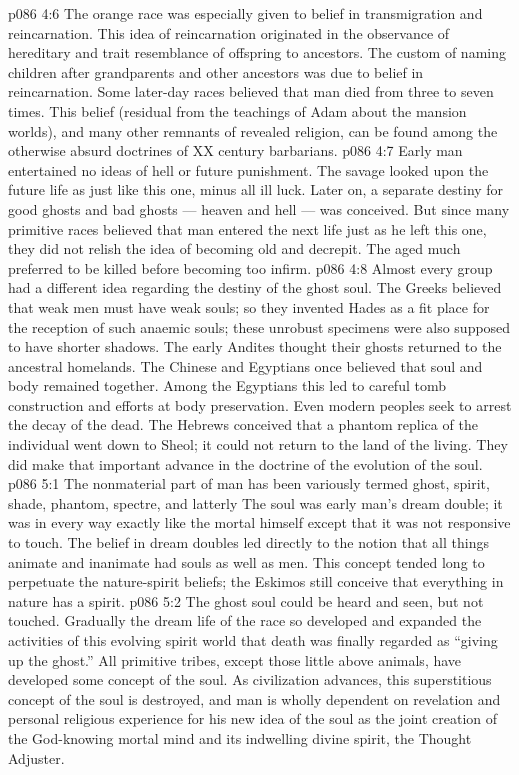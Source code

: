 \vs p086 4:6 The orange race was especially given to belief in transmigration and reincarnation. This idea of reincarnation originated in the observance of hereditary and trait resemblance of offspring to ancestors. The custom of naming children after grandparents and other ancestors was due to belief in reincarnation. Some later\hyp{}day races believed that man died from three to seven times. This belief (residual from the teachings of Adam about the mansion worlds), and many other remnants of revealed religion, can be found among the otherwise absurd doctrines of XX century barbarians.
\vs p086 4:7 \pc Early man entertained no ideas of hell or future punishment. The savage looked upon the future life as just like this one, minus all ill luck. Later on, a separate destiny for good ghosts and bad ghosts --- heaven and hell --- was conceived. But since many primitive races believed that man entered the next life just as he left this one, they did not relish the idea of becoming old and decrepit. The aged much preferred to be killed before becoming too infirm.
\vs p086 4:8 Almost every group had a different idea regarding the destiny of the ghost soul. The Greeks believed that weak men must have weak souls; so they invented Hades as a fit place for the reception of such anaemic souls; these unrobust specimens were also supposed to have shorter shadows. The early Andites thought their ghosts returned to the ancestral homelands. The Chinese and Egyptians once believed that soul and body remained together. Among the Egyptians this led to careful tomb construction and efforts at body preservation. Even modern peoples seek to arrest the decay of the dead. The Hebrews conceived that a phantom replica of the individual went down to Sheol; it could not return to the land of the living. They did make that important advance in the doctrine of the evolution of the soul.
\vs p086 5:1 The nonmaterial part of man has been variously termed ghost, spirit, shade, phantom, spectre, and latterly  The soul was early man’s dream double; it was in every way exactly like the mortal himself except that it was not responsive to touch. The belief in dream doubles led directly to the notion that all things animate and inanimate had souls as well as men. This concept tended long to perpetuate the nature\hyp{}spirit beliefs; the Eskimos still conceive that everything in nature has a spirit.
\vs p086 5:2 The ghost soul could be heard and seen, but not touched. Gradually the dream life of the race so developed and expanded the activities of this evolving spirit world that death was finally regarded as “giving up the ghost.” All primitive tribes, except those little above animals, have developed some concept of the soul. As civilization advances, this superstitious concept of the soul is destroyed, and man is wholly dependent on revelation and personal religious experience for his new idea of the soul as the joint creation of the God\hyp{}knowing mortal mind and its indwelling divine spirit, the Thought Adjuster.
